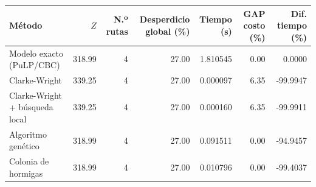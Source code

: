\begin{tabular}{lrrrrrr}
\toprule
Método & $Z$ & N.º rutas & Desperdicio global (\%) & Tiempo (s) & GAP costo (\%) & Dif. tiempo (\%) \\
\midrule
Modelo exacto (PuLP/CBC) & 318.99 & 4 & 27.00 & 1.810545 & 0.00 & 0.0000 \\
Clarke-Wright & 339.25 & 4 & 27.00 & 0.000097 & 6.35 & -99.9947 \\
Clarke-Wright + búsqueda local & 339.25 & 4 & 27.00 & 0.000160 & 6.35 & -99.9911 \\
Algoritmo genético & 318.99 & 4 & 27.00 & 0.091511 & 0.00 & -94.9457 \\
Colonia de hormigas & 318.99 & 4 & 27.00 & 0.010796 & 0.00 & -99.4037 \\
\bottomrule
\end{tabular}

